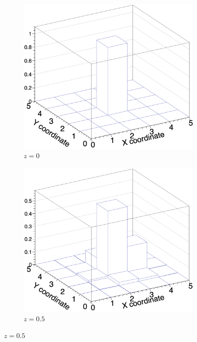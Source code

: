 \documentclass{article}
\begin{document}
\begin{figure}[H]
\centering
\begin{subfigure}{.33\textwidth}
  \centering
  \includegraphics[width=1\linewidth]{images/z0.png}
  \caption{$z=0$}
  \label{fig:z0}
\end{subfigure}%
\begin{subfigure}{.33\textwidth}
  \centering
  \includegraphics[width=1\linewidth]{images/z05.png}
  \caption{$z=0.5$}
  \label{fig:z05}
\end{subfigure}

\end{figure}
\end{document}
